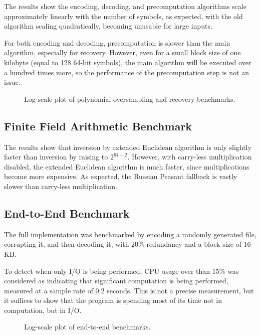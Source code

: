 The results show the encoding, decoding, and precomputation algorithms scale approximately linearly with the number of symbols, as expected, with the old algorithm scaling quadratically, becoming unusable for large inputs.

For both encoding and decoding, precomputation is slower than the main algorithm, especially for recovery.
However, even for a small block size of one kilobyte (equal to 128 64-bit symbols), the main algorithm will be executed over a hundred times more, so the performance of the precomputation step is not an issue.

\begin{figure}[!hbt]
\begin{center}

\end{center}
\caption{Log-scale plot of polynomial oversampling and recovery benchmarks.}
\label{fig:benchmark_log_poly}
\end{figure}

\subsection{Finite Field Arithmetic Benchmark}

The results show that inversion by extended Euclidean algorithm is only slightly faster than inversion by raising to $2^{64 - 2}$.
However, with carry-less multiplication disabled, the extended Euclidean algorithm is much faster, since multiplications become more expensive.
As expected, the Russian Peasant fallback is vastly slower than carry-less multiplication.


\vspace{-1em}

\subsection{End-to-End Benchmark}

The full implementation was benchmarked by encoding a randomly generated file, corrupting it, and then decoding it, with $20\%$ redundancy and a block size of $16$ KB.

To detect when only I/O is being performed, CPU usage over than $15\%$ was considered as indicating that significant computation is being performed, measured at a sample rate of $0.2$ seconds.
This is not a precise measurement, but it suffices to show that the program is spending most of its time not in computation, but in I/O.

\begin{figure}[!hbt]
\begin{center}

\end{center}
\caption{Log-scale plot of end-to-end benchmarks.}
\label{fig:end_to_end_benchmark}
\end{figure}
